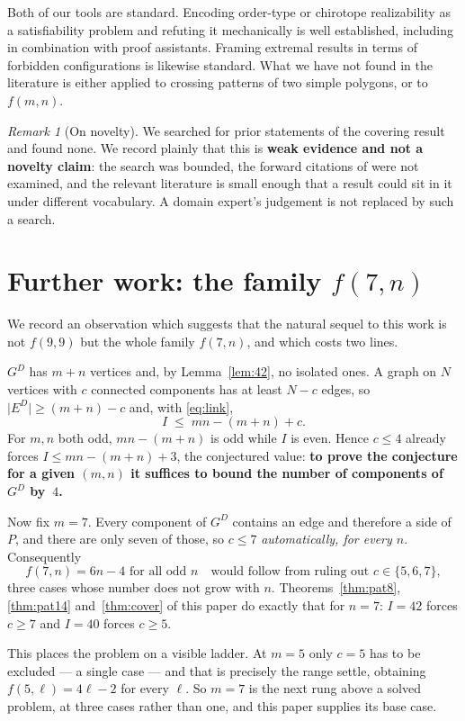 \documentclass[11pt,a4paper]{article}
\theoremstyle{plain}
\theoremstyle{definition}
\theoremstyle{remark}
\newtheorem{remark}[theorem]{Remark}
\newcommand{\GD}{G^{D}}
\newcommand{\ED}{E^{D}}
\begin{document}
Both of our tools are standard. Encoding order-type or chirotope realizability
as a satisfiability problem and refuting it mechanically is well established,
including in combination with proof assistants. Framing extremal results in
terms of forbidden configurations is likewise standard. What we have not found
in the literature is either applied to crossing patterns of two simple
polygons, or to $f(m,n)$.

\begin{remark}[On novelty]\label{rem:novelty}
We searched for prior statements of the covering result and found none. We
record plainly that this is \textbf{weak evidence and not a novelty claim}: the search was bounded, the forward citations of
\cite{CernyEtAl2003} were not examined, and the relevant literature is small
enough that a result could sit in it under different vocabulary. A domain expert's judgement is not replaced by such a search.
\end{remark}

\section{Further work: the family \texorpdfstring{$f(7,n)$}{f(7,n)}}\label{sec:further}

We record an observation which suggests that the natural sequel to this work is
not $f(9,9)$ but the whole family $f(7,n)$, and which costs two lines.

$\GD$ has $m+n$ vertices and, by Lemma~\ref{lem:42}, no isolated ones. A graph
on $N$ vertices with $c$ connected components has at least $N-c$ edges, so
$\lvert \ED\rvert \ge (m+n)-c$ and, with \eqref{eq:link},
\[
  I \;\le\; mn-(m+n)+c .
\]
For $m,n$ both odd, $mn-(m+n)$ is odd while $I$ is even. Hence $c\le 4$ already
forces $I\le mn-(m+n)+3$, the conjectured value: \textbf{to prove the conjecture
for a given $(m,n)$ it suffices to bound the number of components of $\GD$
by~$4$.}

Now fix $m=7$. Every component of $\GD$ contains an edge and therefore a side of
$P$, and there are only seven of those, so $c\le 7$ \emph{automatically, for
every $n$}. Consequently
\[
  f(7,n)=6n-4 \text{ for all odd } n
  \quad\text{would follow from ruling out } c\in\{5,6,7\},
\]
three cases whose number does not grow with $n$. Theorems~\ref{thm:pat8},
\ref{thm:pat14} and~\ref{thm:cover} of this paper do exactly that for $n=7$:
$I=42$ forces $c\ge7$ and $I=40$ forces $c\ge5$.

This places the problem on a visible ladder. At $m=5$ only $c=5$ has to be
excluded --- a single case --- and that is precisely the range
\cite{CernyEtAl2003} settle, obtaining $f(5,\ell)=4\ell-2$ for every $\ell$. So
$m=7$ is the next rung above a solved problem, at three cases rather than one,
and this paper supplies its base case.
\end{document}
